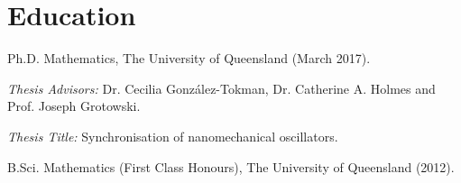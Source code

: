 \documentclass[letterpaper]{article}
\renewenvironment{itemize}{
  \begin{list}{}{
    \setlength{\leftmargin}{1.5em}
  }
}{
  \end{list}
}
\begin{document}
\section*{Education}
\begin{itemize}
	\item Ph.D. Mathematics, The University of Queensland (March 2017).
	\begin{itemize}
		\item \emph{Thesis Advisors:} Dr. Cecilia Gonz\'alez-Tokman, Dr. Catherine A. Holmes and Prof. Joseph Grotowski.
		\item \emph{Thesis Title:} Synchronisation of nanomechanical oscillators.
	\end{itemize}
	\item B.Sci. Mathematics (First Class Honours), The University of Queensland (2012).
\end{itemize}
\end{document}
